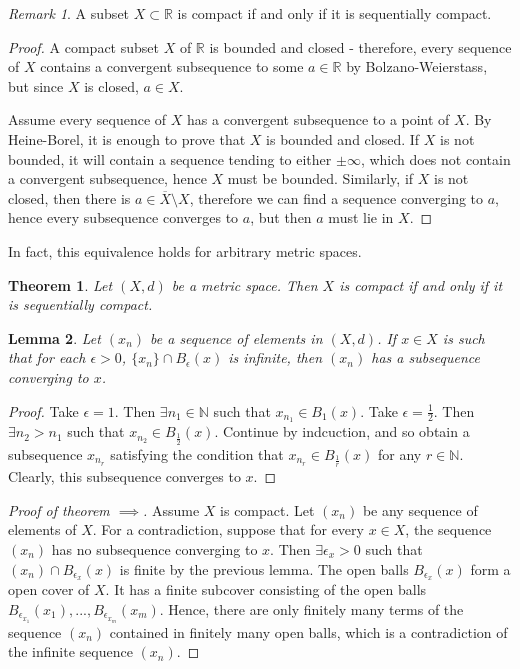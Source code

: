 \documentclass{article}
\theoremstyle{definition}
\theoremstyle{plain}%
\newtheorem{thm}{Theorem}[section]
\newtheorem{lem}[thm]{Lemma}
\theoremstyle{remark}
\newtheorem*{rem}{Remark}
\newcommand{\intersection}{\cap}
\newcommand{\R}{\mathbb{R}}
\begin{document}
\begin{rem}
    A subset $X \subset \R$ is compact if and only if it is sequentially compact.
\end{rem}

\begin{proof}
    A compact subset $X$ of $\R$ is bounded and closed - therefore, every sequence of $X$ contains a convergent subsequence to some $a \in \R$ by Bolzano-Weierstass, but since $X$ is closed, $a \in X$.
    
    Assume every sequence of $X$ has a convergent subsequence to a point of $X$. By Heine-Borel, it is enough to prove that $X$ is bounded and closed. If $X$ is not bounded, it will contain a sequence tending to either $\pm \infty$, which does not contain a convergent subsequence, hence $X$ must be bounded. Similarly, if $X$ is not closed, then there is $a \in \overline{X} \setminus X$, therefore we can find a sequence converging to $a$, hence every subsequence converges to $a$, but then $a$ must lie in $X$.
\end{proof}

In fact, this equivalence holds for arbitrary metric spaces.

\begin{thm}
    Let $(X,d)$ be a metric space. Then $X$ is compact if and only if it is sequentially compact.
\end{thm}

\begin{lem}
    Let $(x_n)$ be a sequence of elements in $(X,d)$. If $x \in X$ is such that for each $\epsilon > 0$, $\{x_n\} \intersection B_\epsilon(x)$ is infinite, then $(x_n)$ has a subsequence converging to $x$.
\end{lem}

\begin{proof}
    Take $\epsilon = 1$. Then $\exists n_1 \in \mathbb{N}$ such that $x_{n_1} \in B_1(x)$. Take $\epsilon = \frac{1}{2}$. Then $\exists n_2 > n_1$ such that $x_{n_2} \in B_{\frac{1}{2}}(x)$. Continue by indcuction, and so obtain a subsequence $x_{n_r}$ satisfying the condition that $x_{n_r} \in B_{\frac{1}{r}}(x)$ for any $r \in \mathbb{N}$. Clearly, this subsequence converges to $x$. 
\end{proof}

\begin{proof}[Proof of theorem $\implies$]
    Assume $X$ is compact. Let $(x_n)$ be any sequence of elements of $X$. For a contradiction, suppose that for every $x \in X$, the sequence $(x_n)$ has no subsequence converging to $x$. Then $\exists \epsilon_x  > 0$ such that $(x_n) \intersection B_{\epsilon_x}(x)$ is finite by the previous lemma. The open balls $B_{\epsilon_x}(x)$ form a open cover of $X$. It has a finite subcover consisting of the open balls $B_{\epsilon_{x_1}}(x_1), ..., B_{\epsilon_{x_m}}(x_m)$. Hence, there are only finitely many terms of the sequence $(x_n)$ contained in finitely many open balls, which is a contradiction of the infinite sequence $(x_n)$.
\end{proof}
\end{document}

